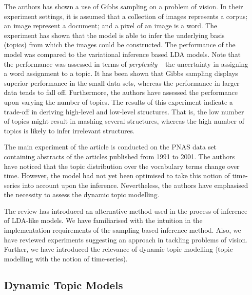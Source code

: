 \documentclass{mprop}
\begin{document}
\par The authors has shown a use of Gibbs sampling on a problem of vision. In their experiment settings, it is assumed that a collection of images represents a corpus; an image represent a document; and a pixel of an image is a word. The experiment has shown that the model is able to infer the underlying basis (topics) from which the images could be constructed. The performance of the model was compared to the variational inference based LDA models. Note that the performance was assessed in terms of \textit{perplexity} -- the uncertainty in assigning a word assignment to a topic. It has been shown that Gibbs sampling displays superior performance in the small data sets, whereas the performance in larger data tends to fall off. Furthermore, the authors have assessed the performance upon varying the number of topics. The results of this experiment indicate a trade-off in deriving high-level and low-level structures. That is, the low number of topics might result in mashing several structures, whereas the high number of topics is likely to infer irrelevant structures.

\par The main experiment of the article is conducted on the PNAS data set containing abstracts of the articles published from 1991 to 2001. The authors have noticed that the topic distribution over the vocabulary terms change over time. However, the model had not yet been optimised to take this notion of time-series into account upon the inference. Nevertheless, the authors have emphasised the necessity to assess the dynamic topic modelling. 

\par The review has introduced an alternative method used in the process of inference of LDA-like models. We have familiarised with the intuition in the implementation requirements of the sampling-based inference method. Also, we have reviewed experiments suggesting an approach in tackling problems of vision. Further, we have introduced the relevance of dynamic topic modelling (topic modelling with the notion of time-series). 

\subsection{Dynamic Topic Models}
\end{document}
